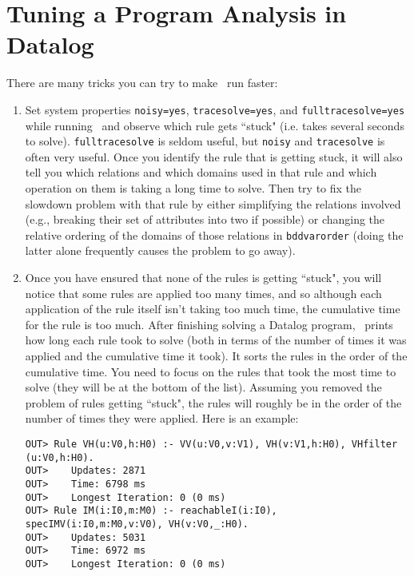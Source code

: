 \section{Tuning a Program Analysis in Datalog}
\label{sec:tuning-datalog-analysis}

There are many tricks you can try to make \bddbddb\ run faster:

\begin{enumerate}
\item
Set system properties \verb+noisy=yes+, \verb+tracesolve=yes+, and \verb+fulltracesolve=yes+
while running \bddbddb\ and observe which rule gets ``stuck" (i.e. takes several seconds to solve).
\verb+fulltracesolve+ is seldom useful, but \verb+noisy+ and \verb+tracesolve+ is
often very useful.  Once you identify the rule that is getting stuck, it
will also tell you which relations and which domains used in that rule
and which operation on them is taking a long time to solve.  Then try
to fix the slowdown problem with that rule by either simplifying the
relations involved (e.g., breaking their set of attributes into two if
possible) or changing the relative ordering of the domains of those
relations in \verb+bddvarorder+ (doing the latter alone
frequently causes the problem to go away).
\item
Once you have ensured that none of the rules is getting ``stuck",
you will notice that some rules are applied too many times, and so
although each application of the rule itself isn't taking too much
time, the cumulative time for the rule is too much.  After finishing
solving a Datalog program, \bddbddb\ prints how long each rule took to
solve (both in terms of the number of times it was applied and the
cumulative time it took).  It sorts the rules in the order of the
cumulative time.  You need to focus on the rules that took the most
time to solve (they will be at the bottom of the list).  Assuming you
removed the problem of rules getting ``stuck", the rules will roughly
be in the order of the number of times they were applied.  Here is an
example:

\begin{verbatim}
OUT> Rule VH(u:V0,h:H0) :- VV(u:V0,v:V1), VH(v:V1,h:H0), VHfilter
(u:V0,h:H0).
OUT>    Updates: 2871
OUT>    Time: 6798 ms
OUT>    Longest Iteration: 0 (0 ms)
OUT> Rule IM(i:I0,m:M0) :- reachableI(i:I0), specIMV(i:I0,m:M0,v:V0), VH(v:V0,_:H0).
OUT>    Updates: 5031
OUT>    Time: 6972 ms
OUT>    Longest Iteration: 0 (0 ms)
\end{verbatim}


\end{enumerate}
